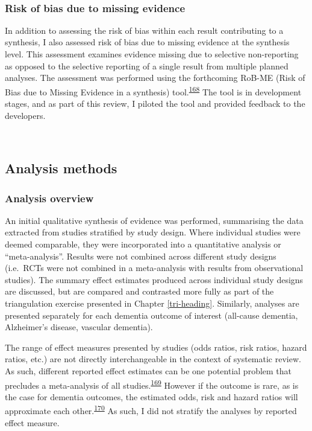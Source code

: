 \documentclass[a4paper, twoside]{templates/ociamthesis}
\begin{document}
~

\hypertarget{methods-rob-me}{%
\subsubsection{Risk of bias due to missing evidence}\label{methods-rob-me}}

In addition to assessing the risk of bias within each result contributing to a synthesis, I also assessed risk of bias due to missing evidence at the synthesis level. This assessment examines evidence missing due to selective non-reporting as opposed to the selective reporting of a single result from multiple planned analyses. The assessment was performed using the forthcoming RoB-ME (Risk of Bias due to Missing Evidence in a synthesis) tool.\textsuperscript{\protect\hyperlink{ref-zotero-15123}{168}} The tool is in development stages, and as part of this review, I piloted the tool and provided feedback to the developers.

~

\hypertarget{analysis-methods}{%
\subsection{Analysis methods}\label{analysis-methods}}

\hypertarget{sys-rev-analysis-overview}{%
\subsubsection{Analysis overview}\label{sys-rev-analysis-overview}}

An initial qualitative synthesis of evidence was performed, summarising the data extracted from studies stratified by study design. Where individual studies were deemed comparable, they were incorporated into a quantitative analysis or ``meta-analysis''. Results were not combined across different study designs (i.e.~RCTs were not combined in a meta-analysis with results from observational studies). The summary effect estimates produced across individual study designs are discussed, but are compared and contrasted more fully as part of the triangulation exercise presented in Chapter \ref{tri-heading}. Similarly, analyses are presented separately for each dementia outcome of interest (all-cause dementia, Alzheimer's disease, vascular dementia).

The range of effect measures presented by studies (odds ratios, risk ratios, hazard ratios, etc.) are not directly interchangeable in the context of systematic review. As such, different reported effect estimates can be one potential problem that precludes a meta-analysis of all studies.\textsuperscript{\protect\hyperlink{ref-mckenzie2019}{169}} However if the outcome is rare, as is the case for dementia outcomes, the estimated odds, risk and hazard ratios will approximate each other.\textsuperscript{\protect\hyperlink{ref-vanderweele2020}{170}} As such, I did not stratify the analyses by reported effect measure.
\end{document}
